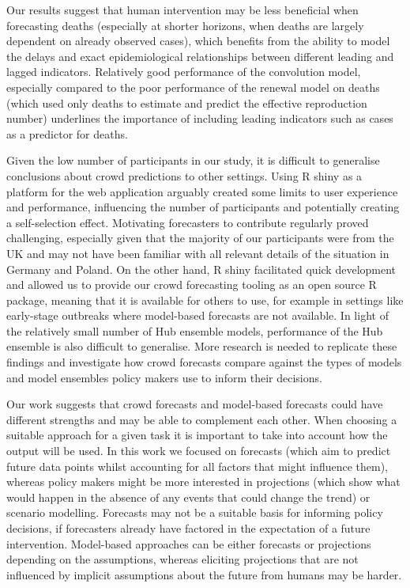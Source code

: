 \documentclass[10pt,letterpaper]{article}
\begin{document}
Our results suggest that human intervention may be less beneficial when
forecasting deaths (especially at shorter horizons, when deaths are
largely dependent on already observed cases), which benefits from the
ability to model the delays and exact epidemiological relationships
between different leading and lagged indicators. Relatively good
performance of the convolution model, especially compared to the poor
performance of the renewal model on deaths (which used only deaths to
estimate and predict the effective reproduction number) underlines the
importance of including leading indicators such as cases as a predictor
for deaths.

Given the low number of participants in our study, it is difficult to
generalise conclusions about crowd predictions to other settings. Using
R shiny as a platform for the web application arguably created some
limits to user experience and performance, influencing the number of
participants and potentially creating a self-selection effect.
Motivating forecasters to contribute regularly proved challenging,
especially given that the majority of our participants were from the UK
and may not have been familiar with all relevant details of the
situation in Germany and Poland. On the other hand, R shiny facilitated
quick development and allowed us to provide our crowd forecasting
tooling as an open source R package, meaning that it is available for
others to use, for example in settings like early-stage outbreaks where
model-based forecasts are not available. In light of the relatively
small number of Hub ensemble models, performance of the Hub ensemble is
also difficult to generalise. More research is needed to replicate these
findings and investigate how crowd forecasts compare against the types
of models and model ensembles policy makers use to inform their
decisions.

Our work suggests that crowd forecasts and model-based forecasts could
have different strengths and may be able to complement each other. When
choosing a suitable approach for a given task it is important to take
into account how the output will be used. In this work we focused on
forecasts (which aim to predict future data points whilst accounting for
all factors that might influence them), whereas policy makers might be
more interested in projections (which show what would happen in the
absence of any events that could change the trend) or scenario
modelling. Forecasts may not be a suitable basis for informing policy
decisions, if forecasters already have factored in the expectation of a
future intervention. Model-based approaches can be either forecasts or
projections depending on the assumptions, whereas eliciting projections
that are not influenced by implicit assumptions about the future from
humans may be harder.
\end{document}

